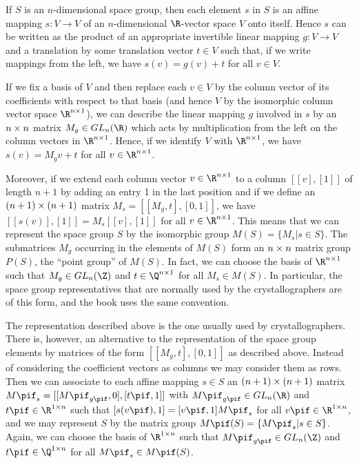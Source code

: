 If $S$ is an $n$-dimensional space group, then each element $s$
in $S$ is an affine mapping $s: V \to V$ of an $n$-dimensional 
$\R$-vector space $V$ onto itself.  Hence $s$ can be written as 
the product of an appropriate invertible linear mapping
$g: V \to V$ and a translation by some translation
vector $t \in V$ such that, if we write mappings from the left, 
we have $s(v) = g(v) + t$ for all $v \in V$.

If we fix a basis of $V$ and then replace each $v \in V$ by the column
vector of its coefficients with respect to that basis (and hence $V$
by the isomorphic column vector space $\R^{n \x 1}$), we can describe
the linear mapping $g$ involved in $s$ by an $n \times n$ matrix
$M_g \in GL_n(\R)$ which acts by multiplication from the left on
the column vectors in $\R^{n \x 1}$.  Hence, if we identify $V$ with
$\R^{n \x 1}$, we have $s(v) = M_g v + t$ for all 
$v \in \R^{n \x 1}$.

Moreover, if we extend each column vector $v \in \R^{n \x 1}$ to a
column $[ [ v ], [ 1 ] ]$ of length $n+1$ by adding an entry 1 
in the last position and if we define an $(n+1) \times (n+1)$ matrix 
$M_s = [ [ M_g, t ], [ 0, 1 ] ]$, we have $[ [ s(v) ], [ 1 ] ] = 
M_s [ [ v ], [ 1 ] ]$ for all $v \in \R^{n \x 1}$. This means that 
we can represent the space group $S$ by the isomorphic group 
$M(S) = \{ M_s | s \in S \}$.  The submatrices $M_g$ occurring in 
the elements of $M(S)$ form an $n \times n$ matrix group $P(S)$, the 
``point group'' of $M(S)$.  In fact, we can choose the basis of 
$\R^{n \x 1}$ such that $M_g \in GL_n(\Z)$ and  $t \in \Q^{n \x 1}$ 
for all $M_s \in M(S)$.  In particular, the space group 
representatives that are normally used by the crystallographers
are of this form, and the book \cite{BBNWZ78} uses the same convention.

The representation described above is the one usually used by
crystallographers. There is, however, an alternative to the
representation of the space group elements by matrices of the form
$[ [ M_g, t ], [ 0, 1 ] ]$ as described above. Instead of 
considering the coefficient vectors as columns we may consider 
them as rows.  Then we can associate to each affine mapping
$s \in S$ an $(n+1) \times (n+1)$ matrix $M\pif_s =
[ [ M\pif_{g\pif}, 0 ], [ t\pif, 1 ] ]$ with 
$M\pif_{g\pif} \in GL_n(\R)$ and $t\pif \in \R^{1 \x n}$ such 
that $[s(v\pif),1] = [v\pif,1] M\pif_s$ for all 
$v\pif \in \R^{1 \x n}$, and we may represent $S$ by the matrix 
group $M\pif(S) = \{ M\pif_s | s \in S \}$.  Again, we can choose 
the basis of $\R^{1 \x n}$ such that $M\pif_{g\pif} \in GL_n(\Z)$ 
and $t\pif \in \Q^{1 \x n}$ for all $M\pif_s \in M\pif(S)$.


